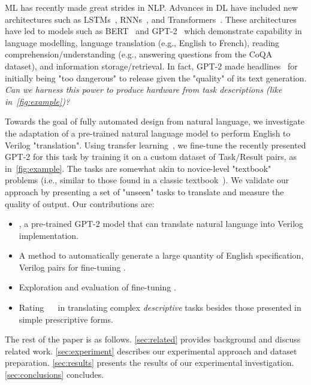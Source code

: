 \ac{ML} has recently made great strides in \ac{NLP}. 
Advances in \ac{DL} have included new architectures such as LSTMs~\cite{sundermeyer2012lstm}, RNNs~\cite{liu2016recurrent}, and Transformers~\cite{vaswani_attention_2017}. 
These architectures have led to models such as BERT~\cite{devlin2018bert} and GPT-2~\cite{radford2019language} which demonstrate capability in language modelling, language translation (e.g., English to French), reading comprehension/understanding (e.g., answering questions from the CoQA~\cite{reddy2019coqa} dataset), and information storage/retrieval. 
In fact, GPT-2 made headlines~\cite{hern2019new} for initially being "too dangerous" to release given the "quality" of its text generation. 
\emph{Can we harness this power to produce hardware from task descriptions (like in~\autoref{fig:example})?} 

Towards the goal of fully automated design from natural language, we investigate the adaptation of a pre-trained natural language model to perform English to Verilog "translation". %
Using transfer learning~\cite{pan_survey_2010}, we fine-tune the recently presented GPT-2 for this task by training it on a custom dataset of Task/Result pairs, as in~\autoref{fig:example}. 
The tasks are somewhat akin to novice-level "textbook" problems (i.e., similar to those found in a classic textbook~\cite{vahid_digital_2010}).
We validate our approach by presenting a set of "unseen" tasks to translate and measure the quality of output. %
Our contributions are:
\begin{itemize}[noitemsep,topsep=0pt,leftmargin=*]
\item \sol, a pre-trained GPT-2 model that can translate natural language into Verilog implementation.
\item A method to automatically generate a large quantity of English specification, Verilog pairs for fine-tuning \sol.
\item Exploration and evaluation of fine-tuning \sol.%
\item Rating ~\sol~ in translating complex \emph{descriptive} tasks besides those presented in simple prescriptive forms.
\end{itemize}
The rest of the paper is as follows. 
\autoref{sec:related} provides background and discuss related work. 
\autoref{sec:experiment} describes our experimental approach and dataset preparation. 
\autoref{sec:results} presents the results of our experimental investigation. 
\autoref{sec:conclusions} concludes.



